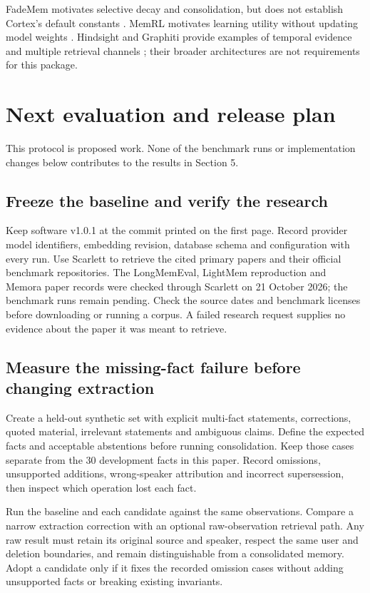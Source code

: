 \documentclass[11pt]{article}
\begin{document}
FadeMem motivates selective decay and consolidation, but does not establish Cortex's default constants \cite{fade}. MemRL motivates learning utility without updating model weights \cite{memrl}. Hindsight and Graphiti provide examples of temporal evidence and multiple retrieval channels \cite{hindsight,graphiti}; their broader architectures are not requirements for this package.

\section{Next evaluation and release plan}
This protocol is proposed work. None of the benchmark runs or implementation changes below contributes to the results in Section 5.

\subsection{Freeze the baseline and verify the research}
Keep software v1.0.1 at the commit printed on the first page. Record provider model identifiers, embedding revision, database schema and configuration with every run. Use Scarlett to retrieve the cited primary papers and their official benchmark repositories. The LongMemEval, LightMem reproduction and Memora paper records were checked through Scarlett on 21 October 2026; the benchmark runs remain pending. Check the source dates and benchmark licenses before downloading or running a corpus. A failed research request supplies no evidence about the paper it was meant to retrieve.

\subsection{Measure the missing-fact failure before changing extraction}
Create a held-out synthetic set with explicit multi-fact statements, corrections, quoted material, irrelevant statements and ambiguous claims. Define the expected facts and acceptable abstentions before running consolidation. Keep those cases separate from the 30 development facts in this paper. Record omissions, unsupported additions, wrong-speaker attribution and incorrect supersession, then inspect which operation lost each fact.

Run the baseline and each candidate against the same observations. Compare a narrow extraction correction with an optional raw-observation retrieval path. Any raw result must retain its original source and speaker, respect the same user and deletion boundaries, and remain distinguishable from a consolidated memory. Adopt a candidate only if it fixes the recorded omission cases without adding unsupported facts or breaking existing invariants.
\end{document}
